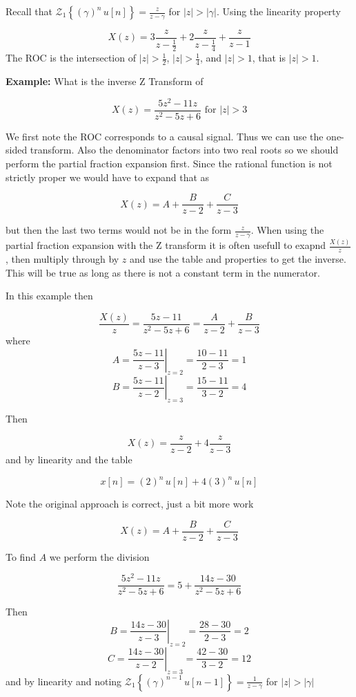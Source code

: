 \documentclass{article}
\begin{document}
Recall that $\mathcal{Z}_1\left\{(\gamma)^n\, u[n]\right\} = \frac{z}{z-\gamma}$ for $|z| > |\gamma|$. Using the linearity property

$$
	X(z) = 3 \frac{z}{z-\frac{1}{2}} + 2 \frac{z}{z-\frac{1}{4}} + \frac{z}{z-1}
$$
The ROC is the intersection of $|z| > \frac{1}{2}$, $|z| > \frac{1}{4}$, and $|z| > 1$, that is $|z| > 1$.


\textbf{Example:} What is the inverse Z Transform of

$$
	X(z) = \frac{5z^2 - 11z}{z^2 - 5z + 6} \text{ for } |z| > 3
$$

We first note the ROC corresponds to a causal signal. Thus we can use the one-sided transform. Also the denominator factors into two real roots so we should perform the partial fraction expansion first. Since the rational function is not strictly proper we would have to expand that as

$$
	X(z) = A + \frac{B}{z-2} + \frac{C}{z-3}
$$

but then the last two terms would not be in the form $\frac{z}{z-\gamma}$. When using the partial fraction expansion with the Z transform it is often usefull to exapnd $\frac{X(z)}{z}$, then multiply through by $z$ and use the table and properties to get the inverse. This will be true as long as there is not a constant term in the numerator.

In this example then

$$
	\frac{X(z)}{z} = \frac{5z - 11}{z^2 - 5z + 6} =  \frac{A}{z-2} + \frac{B}{z-3}
$$
where
$$
	A = \left. \frac{5z-11}{z-3}\right|_{z = 2} = \frac{10-11}{2-3} = 1
$$
$$
	B = \left. \frac{5z-11}{z-2}\right|_{z = 3} = \frac{15-11}{3-2} = 4
$$

Then

$$
	X(z) = \frac{z}{z-2} + 4 \frac{z}{z-3}
$$
and by linearity and the table

$$
	x[n] = (2)^n\, u[n] + 4(3)^n\, u[n]
$$

Note the original approach is correct, just a bit more work

$$
	X(z) = A + \frac{B}{z-2} + \frac{C}{z-3}
$$

To find $A$ we perform the division

$$
	\frac{5z^2 - 11z}{z^2 - 5z + 6} = 5 + \frac{14z-30}{z^2 - 5z + 6}
$$

Then
$$
	B = \left. \frac{14z-30}{z-3}\right|_{z = 2} = \frac{28-30}{2-3} = 2
$$
$$
	C = \left. \frac{14z-30}{z-2}\right|_{z = 3} = \frac{42-30}{3-2} = 12
$$
and by linearity and noting $\mathcal{Z}_1\left\{(\gamma)^{n-1}\, u[n-1]\right\} = \frac{1}{z-\gamma}$ for $|z| > |\gamma|$
\end{document}
